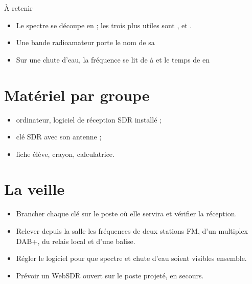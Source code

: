\documentclass{BIRdoc}
\begin{document}
\vspace{6mm}
\begin{BIRencadre}{À retenir}
\begin{itemize}[itemsep=6pt]
\item Le spectre se découpe en \BIRligne[3.5cm] ; les trois plus utiles sont
  \BIRligne[1.5cm], \BIRligne[1.5cm] et \BIRligne[1.5cm].
\item Une bande radioamateur porte le nom de sa \BIRligne[5cm]
\item Sur une chute d'eau, la fréquence se lit de \BIRligne[2.2cm] à
  \BIRligne[2.2cm] et le temps de \BIRligne[2.2cm] en \BIRligne[2.2cm]
\end{itemize}
\end{BIRencadre}

\newpage
{}

\begin{minipage}[t]{.36\linewidth}
\section*{Matériel par groupe}
\begin{itemize}
\item ordinateur, logiciel de réception SDR installé ;
\item clé SDR avec son antenne ;
\item fiche élève, crayon, calculatrice.
\end{itemize}
\end{minipage}\hfill
\begin{minipage}[t]{.60\linewidth}
\section*{La veille}
\begin{itemize}
\item Brancher chaque clé sur le poste où elle servira et vérifier la réception.
\item Relever depuis la salle les fréquences de deux stations FM, d'un
  multiplex DAB+, du relais local et d'une balise.
\item Régler le logiciel pour que spectre et chute d'eau soient visibles ensemble.
\item Prévoir un WebSDR ouvert sur le poste projeté, en secours.
\end{itemize}
\end{minipage}
\end{document}
